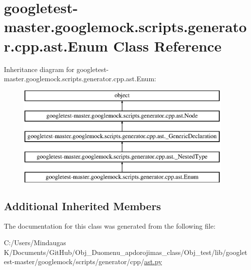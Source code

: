 \hypertarget{classgoogletest-master_1_1googlemock_1_1scripts_1_1generator_1_1cpp_1_1ast_1_1_enum}{}\section{googletest-\/master.googlemock.\+scripts.\+generator.\+cpp.\+ast.\+Enum Class Reference}
\label{classgoogletest-master_1_1googlemock_1_1scripts_1_1generator_1_1cpp_1_1ast_1_1_enum}
Inheritance diagram for googletest-\/master.googlemock.\+scripts.\+generator.\+cpp.\+ast.\+Enum\+:\begin{figure}[H]
\begin{center}
\leavevmode
\includegraphics[height=5.000000cm]{d5/dfc/classgoogletest-master_1_1googlemock_1_1scripts_1_1generator_1_1cpp_1_1ast_1_1_enum}
\end{center}
\end{figure}
\subsection*{Additional Inherited Members}


The documentation for this class was generated from the following file\+:\begin{DoxyCompactItemize}
\item 
C\+:/\+Users/\+Mindaugas K/\+Documents/\+Git\+Hub/\+Obj\+\_\+\+Duomenu\+\_\+apdorojimas\+\_\+class/\+Obj\+\_\+test/lib/googletest-\/master/googlemock/scripts/generator/cpp/\mbox{\hyperlink{_obj__test_2lib_2googletest-master_2googlemock_2scripts_2generator_2cpp_2ast_8py}{ast.\+py}}\end{DoxyCompactItemize}
